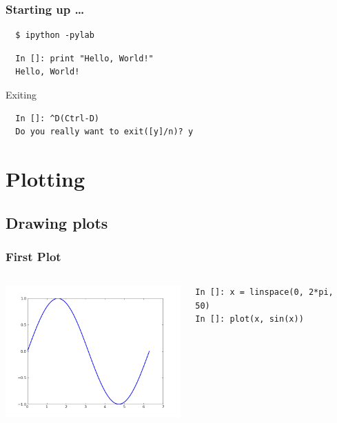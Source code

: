 \documentclass[14pt,compress]{beamer}
\begin{document}
\begin{frame}[fragile]
\frametitle{Starting up \ldots}
\begin{block}{}
\begin{verbatim}
  $ ipython -pylab  
\end{verbatim}
\end{block}
\begin{lstlisting}     
  In []: print "Hello, World!"
  Hello, World!
\end{lstlisting}
Exiting
\begin{lstlisting}     
  In []: ^D(Ctrl-D)
  Do you really want to exit([y]/n)? y
\end{lstlisting}
\end{frame}



\section{Plotting}

\subsection{Drawing plots}
\begin{frame}[fragile]
\frametitle{First Plot}
\begin{columns}
    \hspace*{-0.5in}
  \includegraphics[height=2in, interpolate=true]{data/firstplot}
    \begin{block}{}
    \begin{small}
\begin{lstlisting}
In []: x = linspace(0, 2*pi, 50)
In []: plot(x, sin(x))
\end{lstlisting}
    \end{small}
    \end{block}
\end{columns}
\end{frame}
\end{document}
